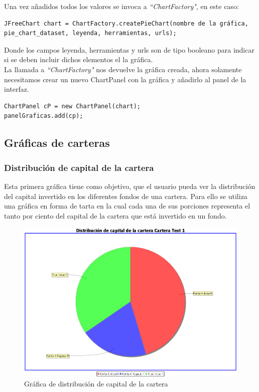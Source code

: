 \documentclass[12pt, a4paper]{book}
\begin{document}
Una vez añadidos todos los valores se invoca a \textit{``ChartFactory"}, en este caso: 

\begin{verbatim}
JFreeChart chart = ChartFactory.createPieChart(nombre de la gráfica,
pie_chart_dataset, leyenda, herramientas, urls);
\end{verbatim}

Donde los campos leyenda, herramientas y urls son de tipo booleano para indicar si se deben incluir dichos elementos el la gráfica.\\

La llamada a \textit{``ChartFactory"} nos devuelve la gráfica creada, ahora solamente necesitamos crear un nuevo ChartPanel con la gráfica y añadirlo al panel de la interfaz.

\begin{verbatim}
ChartPanel cP = new ChartPanel(chart);
panelGraficas.add(cp);
\end{verbatim}
\newpage

\subsection{Gráficas de carteras}

\subsubsection{Distribución de capital de la cartera}

Esta primera gráfica tiene como objetivo, que el usuario pueda ver la distribución del capital invertido en los diferentes fondos de una cartera. Para ello se utiliza una gráfica en forma de tarta en la cual cada una de sus porciones representa el tanto por ciento del capital de la cartera que está invertido en un fondo.\\

	\begin{figure}[htbp]
	\centering
	\includegraphics[width=\textwidth]{figuras/distribucion.PNG}
	\caption{Gráfica de distribución de capital de la cartera}
	\label{fig:distribucion}
	\end {figure}
	
\end{document}
